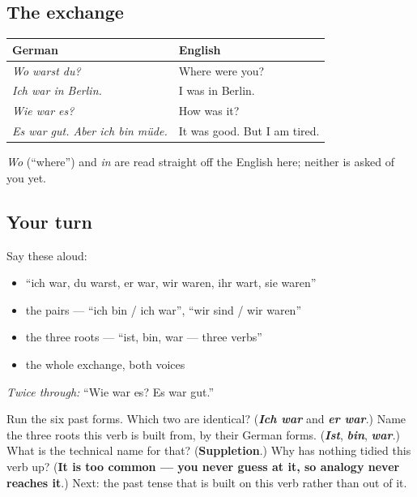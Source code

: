 \subsection*{The exchange}
\noindent
\begin{tabularx}{\linewidth}{@{}>{\raggedright\arraybackslash}X>{\raggedright\arraybackslash}X@{}}
\toprule
\textbf{German} & \textbf{English} \\
\midrule
\emph{Wo warst du?} & Where were you? \\
\emph{Ich war in Berlin.} & I was in Berlin. \\
\emph{Wie war es?} & How was it? \\
\emph{Es war gut. Aber ich bin müde.} & It was good. But I am tired. \\
\bottomrule
\end{tabularx}

\emph{Wo} (\textquotedblleft{}where\textquotedblright{}) and \emph{in} are read straight off the English here; neither is asked of you yet.

\subsection*{Your turn}
Say these aloud:

\begin{itemize}
\raggedright
  \item \textquotedblleft{}ich war, du warst, er war, wir waren, ihr wart, sie waren\textquotedblright{}
  \item the pairs — \textquotedblleft{}ich bin / ich war\textquotedblright{}, \textquotedblleft{}wir sind / wir waren\textquotedblright{}
  \item the three roots — \textquotedblleft{}ist, bin, war — three verbs\textquotedblright{}
  \item the whole exchange, both voices
\end{itemize}

\emph{Twice through:} \textquotedblleft{}Wie war es? Es war gut.\textquotedblright{}

\begin{tcolorbox}[breakable,colback=teal!4,colframe=teal!35!black,title={Before you move on}]
Run the six past forms. Which two are identical? (\emph{\textbf{Ich war}} and \emph{\textbf{er war}}.) Name the three roots this verb is built from, by their German forms. (\emph{\textbf{Ist}}, \emph{\textbf{bin}}, \emph{\textbf{war}}.) What is the technical name for that? (\textbf{Suppletion}.) Why has nothing tidied this verb up? (\textbf{It is too common — you never guess at it, so analogy never reaches it}.) Next: the past tense that is built on this verb rather than out of it.
\end{tcolorbox}
